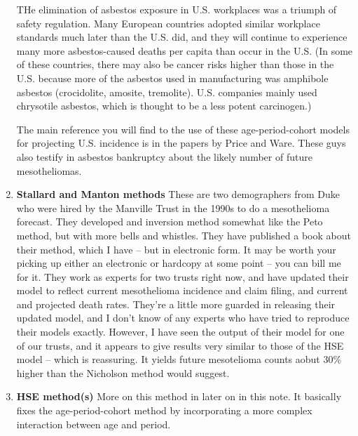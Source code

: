 \documentclass{article}\usepackage{graphicx, color}
\begin{document}
\begin{enumerate}
THe elimination of asbestos exposure in U.S. workplaces was a triumph of safety regulation.  Many European countries adopted similar workplace standards much later than the U.S. did, and they will continue to experience many more asbestos-caused deaths per capita than occur in the U.S. (In some of these countries, there may also be cancer risks higher than those in the U.S. because more of the asbestos used in manufacturing was amphibole asbestos (crocidolite, amosite, tremolite).  U.S. companies mainly used chrysotile asbestos, which is thought to be a less potent carcinogen.)

The main reference you will find to the use of these age-period-cohort models for projecting U.S. incidence is in the papers by Price and Ware.  These guys also testify in asbestos bankruptcy about the likely number of future mesotheliomas.

\item \textbf{Stallard and Manton methods} These are two demographers from Duke who were hired by the Manville Trust in the 1990s to do a mesothelioma forecast.  They developed and inversion method somewhat like the Peto method, but with more bells and whistles.  They have published a book about their method, which I have -- but in electronic form.  It may be worth your picking up either an electronic or hardcopy at some point -- you can bill me for it.  They work as experts for two trusts right now, and have updated their model to reflect current mesothelioma incidence and claim filing, and current and projected death rates.  They're a little more guarded in releasing their updated model, and I don't know of any experts who have tried to reproduce their models exactly.  However, I have seen the output of their model for one of our trusts, and it appears to give results very similar to those of the HSE model -- which is reassuring.  It yields future mesotelioma counts aobut 30\% higher than the Nicholson method would suggest.

\item \textbf{HSE method(s)} More on this method in later on in this note.  It basically fixes the age-period-cohort method by incorporating a more complex interaction between age and period.


\end{enumerate}
\end{document}
